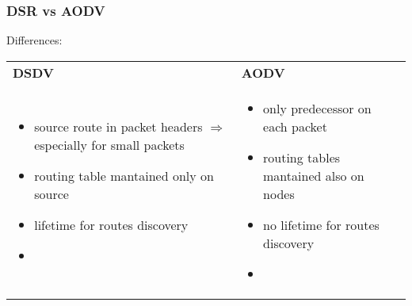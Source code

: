 \subsubsection{DSR vs AODV}
Differences:
\vspace*{0.2cm}
\begin{center}
    \begin{tabular}{|p{5.5cm}|p{5.5cm}|}
        \hline
        \centering \textbf{DSDV} & \centering \textbf{AODV} \arraybackslash\\
        \begin{minipage}{1 \textwidth}
            \vspace*{0.1cm}
            \begin{itemize}
                \addtolength{\itemindent}{-0.5cm}
                \item source route in packet headers \newline\hspace*{-0.5cm}$\Rightarrow$ especially for small packets 
                \vspace*{0.15cm}
                \item routing table mantained only \newline\hspace*{-0.5cm}on source
                \vspace*{0.15cm}
                \item lifetime for routes discovery
                \item[]
            \end{itemize}
        \end{minipage}
        &
        \begin{minipage}{1 \textwidth}
            \vspace*{0.1cm}
            \begin{itemize}
                \addtolength{\itemindent}{-0.5cm}
                \item only predecessor on each \newline\hspace*{-0.5cm}packet
                \vspace*{0.15cm}
                \item routing tables mantained also \newline\hspace*{-0.5cm}on nodes
                \vspace*{0.15cm}
                \item no lifetime for routes discovery
                \item[]
            \end{itemize}
        \end{minipage}
        \\
        \hline
    \end{tabular}
\end{center}


